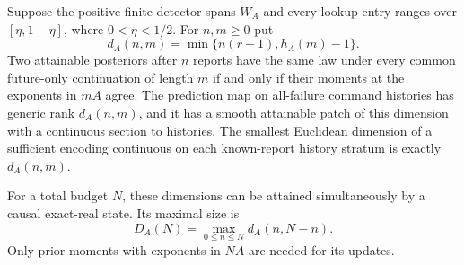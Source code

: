 \begin{theorem}\label{thm:main}
Suppose the positive finite detector spans $W_A$ and every lookup entry
ranges over $[\eta,1-\eta]$, where $0<\eta<1/2$. For $n,m\ge0$ put
\begin{equation}\label{eq:main-dimension}
 d_A(n,m)=\min\{n(r-1),h_A(m)-1\}.
\end{equation}
Two attainable posteriors after $n$ reports have the same law under every
common future-only continuation of length $m$ if and only if their moments
at the exponents in $mA$ agree. The prediction map on all-failure command
histories has generic rank $d_A(n,m)$, and it has a smooth attainable patch
of this dimension with a continuous section to histories. The smallest
Euclidean dimension of a sufficient encoding continuous on each
known-report history stratum is exactly $d_A(n,m)$.

For a total budget $N$, these dimensions can be attained simultaneously
by a causal exact-real state. Its maximal size is
\begin{equation}\label{eq:peak}
 D_A(N)=\max_{0\le n\le N}d_A(n,N-n).
\end{equation}
Only prior moments with exponents in $NA$ are needed for its updates.
\end{theorem}
